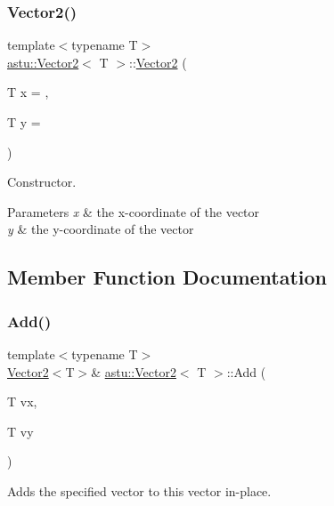 \subsubsection{\texorpdfstring{Vector2()}{Vector2()}}
{\footnotesize\ttfamily template$<$typename T$>$ \\
\hyperlink{classastu_1_1Vector2}{astu\+::\+Vector2}$<$ T $>$\+::\hyperlink{classastu_1_1Vector2}{Vector2} (\begin{DoxyParamCaption}\item[{T}]{x = {},  }\item[{T}]{y = {} }\end{DoxyParamCaption})\hspace{0.3cm}{\ttfamily [inline]}}

Constructor.


\begin{DoxyParams}{Parameters}
{\em x} & the x-\/coordinate of the vector \\
\hline
{\em y} & the y-\/coordinate of the vector \\
\hline
\end{DoxyParams}


\subsection{Member Function Documentation}
\mbox{\label{classastu_1_1Vector2_a253eadef97c7b539c7f275d0c789bc0d}} 
\subsubsection{\texorpdfstring{Add()}{Add()}\hspace{0.1cm}{\footnotesize\ttfamily [1/2]}}
{\footnotesize\ttfamily template$<$typename T$>$ \\
\hyperlink{classastu_1_1Vector2}{Vector2}$<$T$>$\& \hyperlink{classastu_1_1Vector2}{astu\+::\+Vector2}$<$ T $>$\+::Add (\begin{DoxyParamCaption}\item[{T}]{vx,  }\item[{T}]{vy }\end{DoxyParamCaption})\hspace{0.3cm}{\ttfamily [inline]}}

Adds the specified vector to this vector in-\/place.


